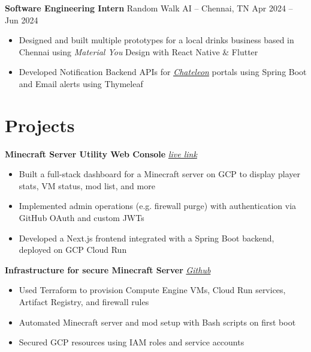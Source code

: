 \documentclass[11pt]{article}       %
\begin{document}
\textbf{Software Engineering Intern} {Random Walk AI} -- Chennai, TN \hfill Apr 2024 -- Jun 2024 \\
\vspace{-9pt}
\begin{itemize}
    \item Designed and built multiple prototypes for a local drinks business
          based in Chennai using \textit{Material You} Design with React Native \& Flutter
    \item Developed Notification Backend APIs for
        \textit{\href{https://chateleon.com}{\underline{Chateleon}}} portals using Spring Boot and
        Email alerts using Thymeleaf
\end{itemize}


\vspace{-18.5pt}

\section*{Projects}

\textbf{Minecraft Server Utility Web Console} \hfill \href{https://mccon.arhm.dev}{\textit{live link}} \\
\vspace{-9pt}
\begin{itemize}
    \item{Built a full-stack dashboard for a Minecraft server on GCP to display player stats, VM status, mod list, and more}
    \item{Implemented admin operations (e.g. firewall purge) with authentication via GitHub OAuth and custom JWTs}
    \item{Developed a Next.js frontend integrated with a Spring Boot backend, deployed on GCP Cloud Run}
\end{itemize}   

\textbf{Infrastructure for secure Minecraft Server} \hfill \href{https://github.com/apparentlyarhm/minecraft-terraform}{\textit{Github}} \\
\vspace{-9pt}
\begin{itemize}
    \item{Used Terraform to provision Compute Engine VMs, Cloud Run services, Artifact Registry, and firewall rules}
    \item{Automated Minecraft server and mod setup with Bash scripts on first boot}
    \item{Secured GCP resources using IAM roles and service accounts}
    \end{itemize}
\end{document}

